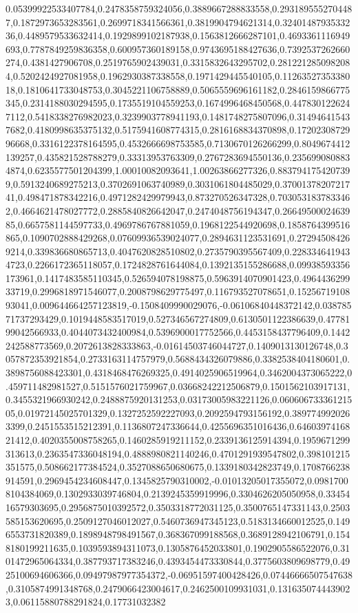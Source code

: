 0.05399922533407784,0.2478358759324056,0.3889667288833558,0.2931895552704487,0.1872973653283561,0.2699718341566361,0.3819904794621314,0.3240148793533236,0.4489579533632414,0.1929899102187938,0.1563812666287101,0.4693361116949693,0.7787849259836358,0.600957360189158,0.9743695188427636,0.7392537262660274,0.4381427906708,0.2519765902439031,0.3315832643295702,0.2812212850982084,0.5202424927081958,0.1962930387338558,0.1971429445540105,0.1126352735338018,0.1810641733048753,0.3045221106758889,0.5065559696161182,0.2846159866775345,0.2314188030294595,0.1735519104559253,0.1674996468450568,0.4478301226247112,0.5418338276982023,0.3239903778941193,0.1481748275807096,0.314946415437682,0.4180998635375132,0.5175941608774315,0.2816168834370898,0.1720230872996668,0.3316122378164595,0.4532666698753585,0.7130670126266299,0.8049674412139257,0.435821528788279,0.33313953763309,0.2767283694550136,0.2356990808834874,0.6235577501204399,1.00010082093641,1.00263866277326,0.8837941754207399,0.5913240689275213,0.3702691063740989,0.3031061804485029,0.3700137820721741,0.498471878342216,0.4971282429979943,0.873270526347328,0.7030531837833462,0.4664621478027772,0.2885840826642047,0.2474048756194347,0.2664950002463985,0.6657581144597733,0.4969786767881059,0.1968122544920698,0.1858764399516865,0.1090702888429268,0.07609936539024077,0.2894631123531691,0.272945084269214,0.339836680865713,0.4047620828510802,0.2735790395567409,0.2283346419434723,0.2266172365118057,0.1724828761644084,0.1392135155286688,0.09938593356173961,0.1417483585110345,0.526594078198875,0.5963914070901423,0.496443629933719,0.2996818971546077,0.2008798629775497,0.116793527078651,0.1525671910893041,0.009644664257123819,-0.1508409990029076,-0.06106840448372142,0.03878571737293429,0.1019448583517019,0.527346567274809,0.6130501122386639,0.4778199042566933,0.4044073432400984,0.5396900017752566,0.4453158437796409,0.1442242588773569,0.2072613828333863,-0.01614503746044727,0.1409013130126748,0.3057872353921854,0.2733163114757979,0.5688434326079886,0.3382538404180601,0.3898756088423301,0.4318468476269325,0.4914025906519964,0.3462004373065222,0.459711482981527,0.5151576021759967,0.03668242212506879,0.1501562103917131,0.3455321966930242,0.2488875920131253,0.03173005983221126,0.06060673336121505,0.01972145025701329,0.1327252592227093,0.2092594793156192,0.3897749920263399,0.2451553515212391,0.1136807247336644,0.4255696351016436,0.6460397416821412,0.4020355008758265,0.1460285919211152,0.2339136125914394,0.1959671299313613,0.2363547336048194,0.4888980821140246,0.4701291939547802,0.398101215351575,0.508662177384524,0.3527088650680675,0.1339180342823749,0.1708766238914591,0.2969454234608447,0.1345825790310002,-0.01013205017355072,0.09817008104384069,0.1302933039746804,0.2139245359919996,0.3304626205050958,0.3345416579303695,0.2956875010392572,0.3503318772031125,0.3500765147331143,0.2503585153620695,0.2509127046012027,0.5460736947345123,0.5183134660012525,0.1496553731820389,0.1898948798491567,0.368367099188568,0.3689128942106791,0.1548180199211635,0.1039593894311073,0.1305876452033801,0.1902905586522076,0.3101472965064334,0.387793717383246,0.4393454473330844,0.3775603809698779,0.4925100694606366,0.09497987977354372,-0.06951597400428426,0.07446666507547638,0.3105874991348768,0.2479066423004617,0.2462500109931031,0.1316350744439023,0.06115880788291824,0.17731032382